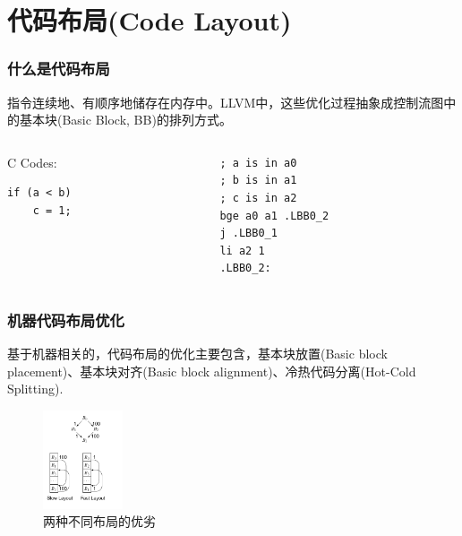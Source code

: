 \section{代码布局(Code Layout)}

\begin{frame}[fragile]
    \frametitle{什么是代码布局}
    指令连续地、有顺序地储存在内存中。LLVM中，这些优化过程抽象成控制流图中的基本块(Basic Block, BB)的排列方式。

    \begin{columns}
        \begin{column}{0.2\textwidth}
            \centering
            C Codes:
            \begin{lstlisting}
if (a < b)
    c = 1;\end{lstlisting}
        \end{column}
        \begin{column}{0.5\textwidth}
            \begin{lstlisting}[language={[RISC-V]Assembler}]
; a is in a0
; b is in a1
; c is in a2
bge a0 a1 .LBB0_2
j .LBB0_1
li a2 1
.LBB0_2:\end{lstlisting}
        \end{column}
    \end{columns}
\end{frame}

\begin{frame}
    \frametitle{机器代码布局优化}
    基于机器相关的，代码布局的优化主要包含，基本块放置(Basic block placement)、基本块对齐(Basic block alignment)、冷热代码分离(Hot-Cold Splitting)\cite{bakhvalov-2019}.
    \begin{figure}
        \centering
        \includegraphics[width=0.21\textwidth]{images/layout_compare.png}
        \caption{两种不同布局的优劣\cite{cooper2011engineering}}
    \end{figure}

\end{frame}


